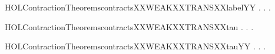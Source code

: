 \begin{SaveVerbatim}{HOLContractionTheoremscontractsXXWEAKXXTRANSXXlabelYY}
\HOLTokenTurnstile{} \HOLSymConst{\HOLTokenForall{}} .
          \HOLSymConst{\HOLTokenImp{}}
       \HOLSymConst{\HOLTokenForall{}} .
            \HOLTokenWeakTransBegin{} \HOLTokenWeakTransEnd {} \HOLSymConst{\HOLTokenImp{}}
           \HOLSymConst{\HOLTokenExists{}}.  \HOLTokenWeakTransBegin{} \HOLTokenWeakTransEnd {} \HOLSymConst{\HOLTokenConj{}}   
\end{SaveVerbatim}
\newcommand{\HOLContractionTheoremscontractsXXWEAKXXTRANSXXlabelYY}{\UseVerbatim{HOLContractionTheoremscontractsXXWEAKXXTRANSXXlabelYY}}
\begin{SaveVerbatim}{HOLContractionTheoremscontractsXXWEAKXXTRANSXXtau}
\HOLTokenTurnstile{} \HOLSymConst{\HOLTokenForall{}} .
          \HOLSymConst{\HOLTokenImp{}}
       \HOLSymConst{\HOLTokenForall{}}.  \HOLTokenWeakTransBegin\HOLConst{\ensuremath{\tau}}\HOLTokenWeakTransEnd {} \HOLSymConst{\HOLTokenImp{}} \HOLSymConst{\HOLTokenExists{}}.    \HOLSymConst{\HOLTokenConj{}}   
\end{SaveVerbatim}
\newcommand{\HOLContractionTheoremscontractsXXWEAKXXTRANSXXtau}{\UseVerbatim{HOLContractionTheoremscontractsXXWEAKXXTRANSXXtau}}
\begin{SaveVerbatim}{HOLContractionTheoremscontractsXXWEAKXXTRANSXXtauYY}
\HOLTokenTurnstile{} \HOLSymConst{\HOLTokenForall{}} .
          \HOLSymConst{\HOLTokenImp{}}
       \HOLSymConst{\HOLTokenForall{}} .  \HOLTokenWeakTransBegin\HOLConst{\ensuremath{\tau}}\HOLTokenWeakTransEnd {} \HOLSymConst{\HOLTokenImp{}} \HOLSymConst{\HOLTokenExists{}}.    \HOLSymConst{\HOLTokenConj{}}   
\end{SaveVerbatim}
